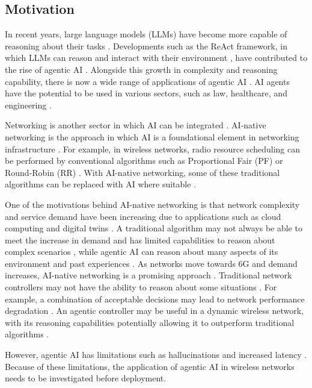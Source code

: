 \documentclass[12pt,a4paper]{article}
\begin{document}
\subsection{Motivation}
In recent years, large language models (LLMs) have become more capable of reasoning about their tasks \cite{xu2025toward}. Developments such as the ReAct framework, in which LLMs can reason and interact with their environment \cite{yao2023react}, have contributed to the rise of agentic AI \cite{wang2024survey}. Alongside this growth in complexity and reasoning capability, there is now a wide range of applications of agentic AI \cite{wang2024survey}. AI agents have the potential to be used in various sectors, such as law, healthcare, and engineering \cite{wang2024survey}. 


Networking is another sector in which AI can be integrated \cite{polese2023understanding}. AI-native networking is the approach in which AI is a foundational element in networking infrastructure \cite{ferrag20266g}. For example, in wireless networks, radio resource scheduling can be performed by conventional algorithms such as Proportional Fair (PF) or Round-Robin (RR) \cite{mamane2022scheduling}. With AI-native networking, some of these traditional algorithms can be replaced with AI where suitable \cite{mamane2022scheduling}. 


One of the motivations behind AI-native networking is that network complexity and service demand have been increasing due to applications such as cloud computing and digital twins \cite{mamane2022scheduling,ferrag20266g}. A traditional algorithm may not always be able to meet the increase in demand and has limited capabilities to reason about complex scenarios \cite{ferrag20266g}, while agentic AI can reason about many aspects of its environment and past experiences \cite{wang2024survey}. As networks move towards 6G and demand increases, AI-native networking is a promising approach \cite{ferrag20266g}. Traditional network controllers may not have the ability to reason about some situations \cite{ferrag20266g}. For example, a combination of acceptable decisions may lead to network performance degradation \cite{tsvetkov2015post}. An agentic controller may be useful in a dynamic wireless network, with its reasoning capabilities potentially allowing it to outperform traditional algorithms \cite{dzaferagic2026ai}. 

However, agentic AI has limitations such as hallucinations and increased latency \cite{wang2024survey}. Because of these limitations, the application of agentic AI in wireless networks needs to be investigated before deployment.
\end{document}
